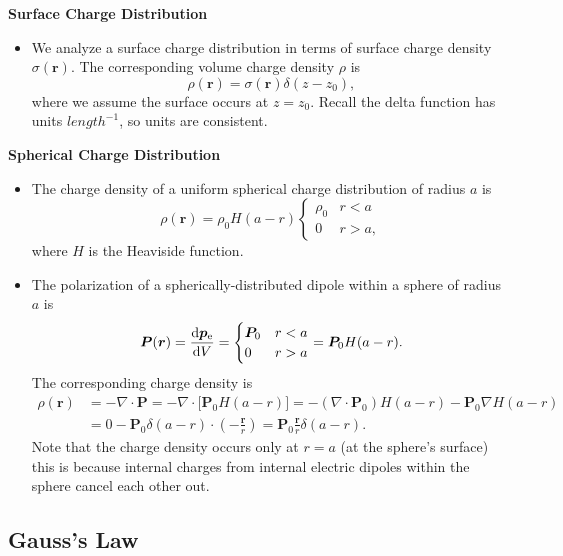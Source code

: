 \documentclass[11pt, a4paper]{article}
\renewcommand{\vec}[1]{\bm{#1}} %
\renewcommand{\r}{\vec{r}}
\newcommand{\pe}{\vec{p}_{\text{e}}}  %
\renewcommand{\div}{\nabla \cdot}
\renewcommand{\grad}{\nabla}
\begin{document}
\textbf{Surface Charge Distribution}
\begin{itemize}
	\item We analyze a surface charge distribution in terms of surface charge density $ \sigma(\r) $. The corresponding volume charge density $ \rho $ is
	\begin{equation*}
		\rho(\r) = \sigma(\r) \delta(z - z_{0}),
	\end{equation*}
	where we assume the surface occurs at $ z = z_{0} $. Recall the delta function has units $ \si{length}^{-1} $, so units are consistent.
\end{itemize}

\textbf{Spherical Charge Distribution}
\begin{itemize}	
	\item The charge density of a uniform spherical charge distribution of radius $ a $ is
	\begin{equation*}
		\rho(\r) = \rho_{0}H(a - r)
		\begin{cases}
			\rho_{0} & r < a\\
			0 & r > a,
		\end{cases}
	\end{equation*}
	where $ H $ is the Heaviside function.
	
	\item The polarization of a spherically-distributed dipole within a sphere of radius $ a $ is 
	\begin{equation*}
		\vec{P}(\r) = \dv{\pe}{V} = 
		\begin{cases}
			\vec{P}_{0} & r < a\\
			0 & r > a
		\end{cases}
		= \vec{P}_{0}H(a - r).
	\end{equation*}
	The corresponding charge density is
	\begin{align*}
		\rho(\r) &= - \div \vec{P} = - \div \big[\vec{P}_{0}H(a - r)\big] = - (\div \vec{P}_{0})H(a - r) - \vec{P}_{0} \grad H(a -r)\\
		&= 0 - \vec{P}_{0} \delta(a-r) \cdot \left (-\frac{\r}{r}\right) = \vec{P}_{0}\frac{\r}{r} \delta(a-r).
	\end{align*}
	Note that the charge density occurs only at $ r = a $ (at the sphere's surface) this is because internal charges from internal electric dipoles within the sphere cancel each other out.
\end{itemize}

\subsection{Gauss's Law}
\end{document}
